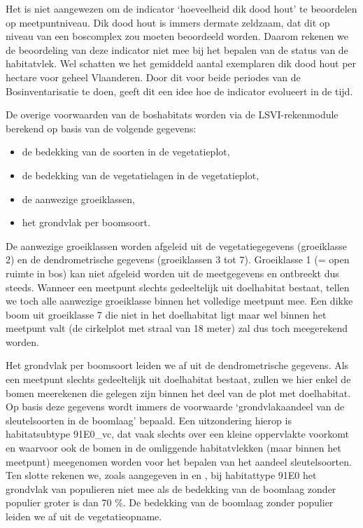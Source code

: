 \documentclass[twoside]{extreport}
\begin{document}
Het is niet aangewezen om de indicator `hoeveelheid dik dood hout' te
beoordelen op meetpuntniveau. Dik dood hout is immers dermate zeldzaam,
dat dit op niveau van een boscomplex zou moeten beoordeeld worden.
Daarom rekenen we de beoordeling van deze indicator niet mee bij het
bepalen van de status van de habitatvlek. Wel schatten we het gemiddeld
aantal exemplaren dik dood hout per hectare voor geheel Vlaanderen. Door
dit voor beide periodes van de Bosinventarisatie te doen, geeft dit een
idee hoe de indicator evolueert in de tijd.

\needspace{50mm} De overige voorwaarden van de boshabitats worden via de
LSVI-rekenmodule berekend op basis van de volgende gegevens:

\begin{itemize}
\tightlist
\item
  de bedekking van de soorten in de vegetatieplot,
\item
  de bedekking van de vegetatielagen in de vegetatieplot,
\item
  de aanwezige groeiklassen,
\item
  het grondvlak per boomsoort.
\end{itemize}

De aanwezige groeiklassen worden afgeleid uit de vegetatiegegevens
(groeiklasse 2) en de dendrometrische gegevens (groeiklassen 3 tot 7).
Groeiklasse 1 (= open ruimte in bos) kan niet afgeleid worden uit de
meetgegevens en ontbreekt dus steeds. Wanneer een meetpunt slechts
gedeeltelijk uit doelhabitat bestaat, tellen we toch alle aanwezige
groeiklasse binnen het volledige meetpunt mee. Een dikke boom uit
groeiklasse 7 die niet in het doelhabitat ligt maar wel binnen het
meetpunt valt (de cirkelplot met straal van 18 meter) zal dus toch
meegerekend worden.

Het grondvlak per boomsoort leiden we af uit de dendrometrische
gegevens. Als een meetpunt slechts gedeeltelijk uit doelhabitat bestaat,
zullen we hier enkel de bomen meerekenen die gelegen zijn binnen het
deel van de plot met doelhabitat. Op basis deze gegevens wordt immers de
voorwaarde `grondvlakaandeel van de sleutelsoorten in de boomlaag'
bepaald. Een uitzondering hierop is habitatsubtype 91E0\_vc, dat vaak
slechts over een kleine oppervlakte voorkomt en waarvoor ook de bomen in
de omliggende habitatvlekken (maar binnen het meetpunt) meegenomen
worden voor het bepalen van het aandeel sleutelsoorten. Ten slotte
rekenen we, zoals aangegeven in \citet{TJollyn2009} en
\citet{Oosterlynck2018}, bij habitattype 91E0 het grondvlak van
populieren niet mee als de bedekking van de boomlaag zonder populier
groter is dan 70 \%. De bedekking van de boomlaag zonder populier leiden
we af uit de vegetatieopname.
\end{document}
